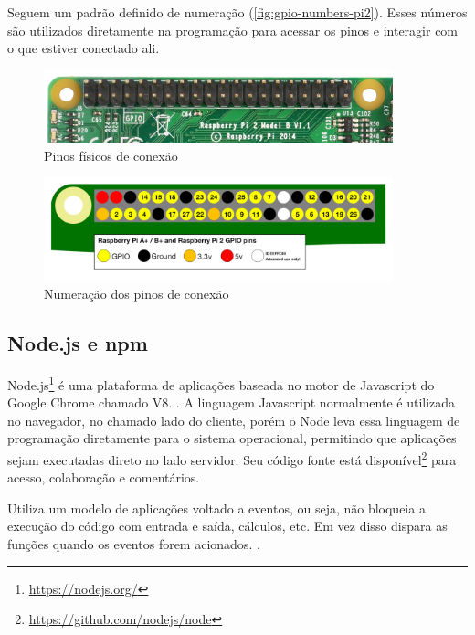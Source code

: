 \documentclass[
		12pt,				%
		openright,			%
		oneside,			%
		a4paper,			%
		chapter=TITLE,		%
		english,			%
		brazil				%
	]{abntex2}
\begin{document}
Seguem um padrão definido de numeração (\autoref{fig:gpio-numbers-pi2}). Esses números são utilizados diretamente na programação para acessar os pinos e interagir com o que estiver conectado ali.

\begin{figure}[htb]
	\caption{\label{fig:gpio-pins-pi2}Pinos físicos de conexão}
	\begin{center}
		\includegraphics[width=0.9\textwidth]{img/gpio-pins-pi2.jpg}
	\end{center}
\end{figure}

\begin{figure}[htb]
	\caption{\label{fig:gpio-numbers-pi2}Numeração dos pinos de conexão}
	\begin{center}
		\includegraphics[width=0.9\textwidth]{img/gpio-numbers-pi2.png}
	\end{center}
\end{figure}


\subsection{Node.js e npm}\label{sec:node-js}

Node.js\footnote{\url{https://nodejs.org/}} é uma plataforma de aplicações baseada no motor de Javascript do Google Chrome chamado V8. \cite{o-que-e-node}. A linguagem Javascript normalmente é utilizada no navegador, no chamado lado do cliente, porém o Node leva essa linguagem de programação diretamente para o sistema operacional, permitindo que aplicações sejam executadas direto no lado servidor. Seu código fonte está disponível\footnote{\url{https://github.com/nodejs/node}} para acesso, colaboração e comentários.

Utiliza um modelo de aplicações voltado a eventos, ou seja, não bloqueia a execução do código com entrada e saída, cálculos, etc. Em vez disso dispara as funções quando os eventos forem acionados. \cite{o-que-e-node}.
\end{document}
